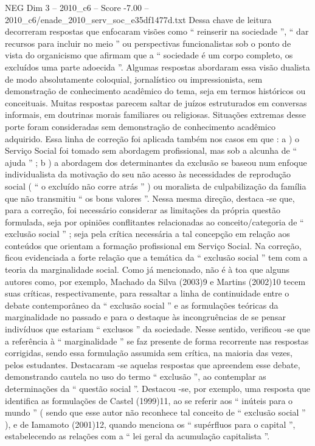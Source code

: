 \begin{textsample}{NEG Dim 3 – 2010\_c6 – Score -7.00 – 2010\_c6/enade\_2010\_serv\_soc\_e35df1477d.txt}
Dessa chave de leitura decorreram respostas que enfocaram visões como “ reinserir na sociedade ”, “ dar recursos para incluir no meio ” ou perspectivas funcionalistas sob o ponto de vista do organicismo que afirmam que a “ sociedade é um corpo completo, os excluídos uma parte adoecida ”.
Algumas respostas abordaram essa visão dualista de modo absolutamente coloquial, jornalístico ou impressionista, sem demonstração de conhecimento acadêmico do tema, seja em termos históricos ou conceituais.
Muitas respostas parecem saltar de juízos estruturados em conversas informais, em doutrinas morais familiares ou religiosas.
Situações extremas desse porte foram consideradas sem demonstração de conhecimento acadêmico adquirido.
Essa linha de correção foi aplicada também nos casos em que : a ) o Serviço Social foi tomado sem abordagem profissional, mas sob a alcunha de “ ajuda ” ; b ) a abordagem dos determinantes da exclusão se baseou num enfoque individualista da motivação do seu não acesso às necessidades de reprodução social ( “ o excluído não corre atrás ” ) ou moralista de culpabilização da família que não transmitiu “ os bons valores ”.
Nessa mesma direção, destaca -se que, para a correção, foi necessário considerar as limitações da própria questão formulada, seja por opiniões conflitantes relacionadas ao conceito/categoria de “ exclusão social ” ; seja pela crítica necessária a tal concepção em relação aos conteúdos que orientam a formação profissional em Serviço Social.
Na correção, ficou evidenciada a forte relação que a temática da “ exclusão social ” tem com a teoria da marginalidade social.
Como já mencionado, não é à toa que alguns autores como, por exemplo, Machado da Silva (2003)9 e Martins (2002)10 tecem suas críticas, respectivamente, para ressaltar a linha de continuidade entre o debate contemporâneo da “ exclusão social ” e as formulações teóricas da marginalidade no passado e para o destaque às incongruências de se pensar indivíduos que estariam “ exclusos ” da sociedade.
Nesse sentido, verificou -se que a referência à “ marginalidade ” se faz presente de forma recorrente nas respostas corrigidas, sendo essa formulação assumida sem crítica, na maioria das vezes, pelos estudantes.
Destacaram -se aquelas respostas que apreendem esse debate, demonstrando cautela no uso do termo “ exclusão ”, ao contemplar as determinações da “ questão social ”.
Destacou -se, por exemplo, uma resposta que identifica as formulações de Castel (1999)11, ao se referir aos “ inúteis para o mundo ” ( sendo que esse autor não reconhece tal conceito de “ exclusão social ” ), e de Iamamoto (2001)12, quando menciona os “ supérfluos para o capital ”, estabelecendo as relações com a “ lei geral da acumulação capitalista ”.

\end{textsample}
